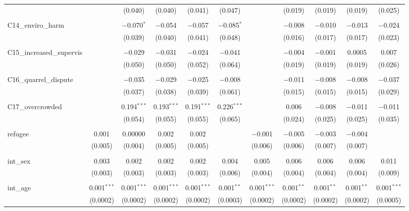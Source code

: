 \begin{table}[H]
\begin{tabular}{@{\extracolsep{4pt}}lcccccccccc}
  &  & (0.040) & (0.040) & (0.041) & (0.047) &  & (0.019) & (0.019) & (0.019) & (0.025) \\ 
  & & & & & & & & & & \\ 
 C14\_enviro\_harm &  & $-$0.070$^{*}$ & $-$0.054 & $-$0.057 & $-$0.085$^{*}$ &  & $-$0.008 & $-$0.010 & $-$0.013 & $-$0.024 \\ 
  &  & (0.039) & (0.040) & (0.041) & (0.048) &  & (0.016) & (0.017) & (0.017) & (0.023) \\ 
  & & & & & & & & & & \\ 
 C15\_increased\_supervis &  & $-$0.029 & $-$0.031 & $-$0.024 & $-$0.041 &  & $-$0.004 & $-$0.001 & 0.0005 & 0.007 \\ 
  &  & (0.050) & (0.050) & (0.052) & (0.064) &  & (0.019) & (0.019) & (0.019) & (0.026) \\ 
  & & & & & & & & & & \\ 
 C16\_quarrel\_dispute &  & $-$0.035 & $-$0.029 & $-$0.025 & $-$0.008 &  & $-$0.011 & $-$0.008 & $-$0.008 & $-$0.037 \\ 
  &  & (0.037) & (0.038) & (0.039) & (0.061) &  & (0.015) & (0.015) & (0.015) & (0.029) \\ 
  & & & & & & & & & & \\ 
 C17\_overcrowded &  & 0.194$^{***}$ & 0.193$^{***}$ & 0.191$^{***}$ & 0.226$^{***}$ &  & 0.006 & $-$0.008 & $-$0.011 & $-$0.011 \\ 
  &  & (0.054) & (0.055) & (0.055) & (0.065) &  & (0.024) & (0.025) & (0.025) & (0.035) \\ 
  & & & & & & & & & & \\ 
 refugee & 0.001 & 0.00000 & 0.002 & 0.002 &  & $-$0.001 & $-$0.005 & $-$0.003 & $-$0.004 &  \\ 
  & (0.005) & (0.004) & (0.005) & (0.005) &  & (0.006) & (0.006) & (0.007) & (0.007) &  \\ 
  & & & & & & & & & & \\ 
 int\_sex & 0.003 & 0.002 & 0.002 & 0.002 & 0.004 & 0.005 & 0.006 & 0.006 & 0.006 & 0.011 \\ 
  & (0.003) & (0.003) & (0.003) & (0.003) & (0.006) & (0.004) & (0.004) & (0.004) & (0.004) & (0.009) \\ 
  & & & & & & & & & & \\ 
 int\_age & 0.001$^{***}$ & 0.001$^{***}$ & 0.001$^{***}$ & 0.001$^{***}$ & 0.001$^{**}$ & 0.001$^{***}$ & 0.001$^{**}$ & 0.001$^{**}$ & 0.001$^{**}$ & 0.001$^{***}$ \\ 
  & (0.0002) & (0.0002) & (0.0002) & (0.0002) & (0.0003) & (0.0002) & (0.0002) & (0.0002) & (0.0002) & (0.0005) \\ 

\end{tabular}
\end{table}
